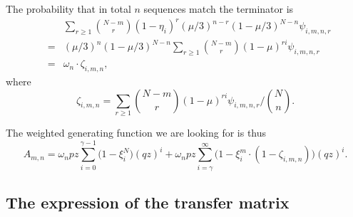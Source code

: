 \documentclass{article}
\begin{document}
The probability that in
total $n$ sequences match the terminator is
\begin{eqnarray*}
&\;& \sum_{r\geq1} {N-m \choose r}
(1 - \eta_i)^r (\mu/3)^{n-r} (1-\mu/3)^{N-n} \psi_{i,m,n,r} \\
&=& (\mu/3)^n(1-\mu/3)^{N-n} \sum_{r\geq1} {N-m \choose r}
  (1 - \mu)^{ri} \psi_{i,m,n,r} \\
&=& \omega_n \cdot \zeta_{i,m,n},
\end{eqnarray*}
where
\begin{equation}
\label{eq:zeta}
\zeta_{i,m,n} = \sum_{r\geq1} {N-m \choose r}
(1-\mu)^{ri} \psi_{i,m,n,r} \bigg/ {N \choose n}.
\end{equation}


The weighted generating function we are looking for is thus
\begin{equation}
\label{eq:A}
A_{m,n} =
\omega_n pz \sum_{i=0}^{\gamma-1} \Big(1 - \xi_i^N \Big) (qz)^i + \omega_n
pz \sum_{i=\gamma}^\infty \Big(1 - \xi_i^m \cdot
(1- \zeta_{i,m,n}) \Big) (qz)^i.
\end{equation}

\subsection{The expression of the transfer matrix}
\end{document}

